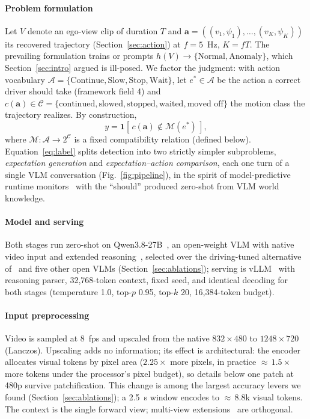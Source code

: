 \documentclass[conference]{IEEEtran}
\newcommand{\act}{\boldsymbol{a}}          %
\newcommand{\ind}{\mathbf{1}}              %
\newcommand{\Acal}{\mathcal{A}}            %
\newcommand{\Mcal}{\mathcal{M}}            %
\newcommand{\Ccal}{\mathcal{C}}            %
\begin{document}
\paragraph{Problem formulation} Let $V$ denote an ego-view clip of duration $T$ and $\act = ((v_1, \psi_1), \dots, (v_K, \psi_K))$ its recovered trajectory (Section~\ref{sec:action}) at $f = 5$~Hz, $K = fT$. The prevailing formulation trains or prompts $h(V) \rightarrow \{\text{Normal}, \text{Anomaly}\}$, which Section~\ref{sec:intro} argued is ill-posed. We factor the judgment: with action vocabulary $\Acal = \{\text{Continue}, \text{Slow}, \text{Stop}, \text{Wait}\}$, let $e^* \in \Acal$ be the action a correct driver should take (framework field 4) and $c(\act) \in \Ccal = \{\text{continued}, \text{slowed}, \text{stopped}, \text{waited}, \text{moved off}\}$ the motion class the trajectory realizes. By construction,
\begin{equation}
y = \ind\!\left[\, c(\act) \notin \Mcal(e^*) \,\right],\label{eq:label}
\end{equation}
where $\Mcal : \Acal \rightarrow 2^{\Ccal}$ is a fixed compatibility relation (defined below). Equation~\eqref{eq:label} splits detection into two strictly simpler subproblems, \emph{expectation generation} and \emph{expectation--action comparison}, each one turn of a single VLM conversation (Fig.~\ref{fig:pipeline}), in the spirit of model-predictive runtime monitors~\cite{b31} with the ``should'' produced zero-shot from VLM world knowledge.

\paragraph{Model and serving} Both stages run zero-shot on Qwen3.8-27B~\cite{b32}, an open-weight VLM with native video input and extended reasoning~\cite{b33}, selected over the driving-tuned alternative of~\cite{b11} and five other open VLMs (Section~\ref{sec:ablations}); serving is vLLM~\cite{b34} with reasoning parser, 32{,}768-token context, fixed seed, and identical decoding for both stages (temperature 1.0, top-$p$ 0.95, top-$k$ 20, 16{,}384-token budget).

\paragraph{Input preprocessing} Video is sampled at 8~fps and upscaled from the native $832\times480$ to $1248\times720$ (Lanczos). Upscaling adds no information; its effect is architectural: the encoder allocates visual tokens by pixel area ($2.25\times$ more pixels, in practice ${\approx}\,1.5\times$ more tokens under the processor's pixel budget), so details below one patch at 480p survive patchification. This change is among the largest accuracy levers we found (Section~\ref{sec:ablations}); a 2.5~s window encodes to ${\approx}\,8.8$k visual tokens. The context is the single forward view; multi-view extensions~\cite{b15,b16,b17,b18} are orthogonal.
\end{document}
